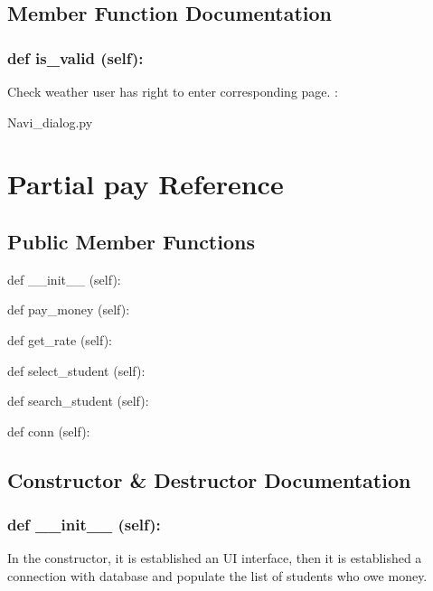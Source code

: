 \subsection{Member Function Documentation}
\hypertarget{class_poly_a14a7ad77ce612b0c54f531d307ee4b39}{
\subsubsection[{def is_valid (self):}]{\setlength{\rightskip}{0pt plus 5cm}def {is\_valid} (self):}}\label{class_poly_a14a7ad77ce612b0c54f531d307ee4b39}
Check weather user has right to enter corresponding page.
:\begin{DoxyCompactItemize}
\item 
Navi\_dialog.\-py\end{DoxyCompactItemize}

\hypertarget{Partial_pay}{\section{Partial pay Reference}
\label{Partial_pay}
}
\subsection*{Public Member Functions}
\begin{DoxyCompactItemize}
\item 
def {\_\_init\_\_} (self):
\item 
def {pay\_money} (self):
\item 
def {get\_rate} (self):
\item 
def {select\_student} (self):
\item 
def {search\_student} (self):
\item 
def {conn} (self):
\end{DoxyCompactItemize}

\subsection{Constructor \& Destructor Documentation}
\hypertarget{class_poly_aa3def076b74bed67904976ad4f9fe9b1}{
\subsubsection[{def __init__ (self):}]{\setlength{\rightskip}{0pt plus 5cm}def {\_\_init\_\_} (self): 
}}
In the constructor, it is established an UI interface, then it is  established a connection with database and populate the list of students who owe money.
 

